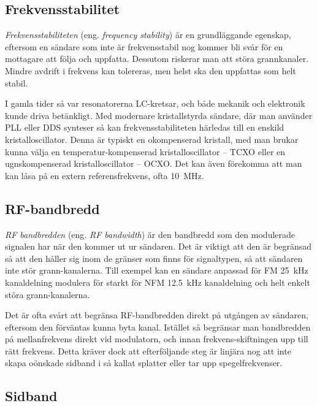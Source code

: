 \subsection{Frekvensstabilitet}

\emph{Frekvensstabiliteten} (eng. \emph{frequency stability}) är en
grundläggande egenskap, eftersom en sändare som inte är frekvensstabil nog
kommer bli svår för en mottagare att följa och uppfatta.
Dessutom riskerar man att störa grannkanaler.
Mindre avdrift i frekvens kan tolereras, men helst ska den uppfattas som
helt stabil.

I gamla tider så var resonatorerna LC-kretsar, och både mekanik och elektronik
kunde driva betänkligt.
Med modernare kristallstyrda sändare, där man använder PLL eller DDS
synteser så kan frekvensstabiliteten härledas till en enskild
kristalloscillator.
Denna är typiskt en okompenserad kristall, med man brukar kunna välja en
temperatur-kompenserad kristalloscillator -- TCXO eller en ugnskompenserad
kristalloscillator -- OCXO.
Det kan även förekomma att man kan låsa på en extern referensfrekvens,
ofta 10~MHz.

\subsection{RF-bandbredd}

\emph{RF bandbredden} (eng. \emph{RF bandwidth}) är den bandbredd som den
modulerade signalen har när den kommer ut ur sändaren.
Det är viktigt att den är begränsad så att den håller sig inom de gränser
som finns för signaltypen, så att sändaren inte stör grann-kanalerna.
Till exempel kan en sändare anpassad för FM \SI{25}{\kilo\hertz} kanaldelning
modulera för starkt för NFM \SI{12,5}{\kilo\hertz} kanaldelning och helt enkelt
störa grann-kanalerna.

Det är ofta svårt att begränsa RF-bandbredden direkt på utgången av sändaren,
eftersom den förväntas kunna byta kanal.
Istället så begränsar man bandbredden på mellanfrekvens direkt vid modulatorn,
och innan frekvens-skiftningen upp till rätt frekvens.
Detta kräver dock att efterföljande steg är linjära nog att inte skapa oönskade
sidband i så kallat splatter eller tar upp spegelfrekvenser.

\subsection{Sidband}

